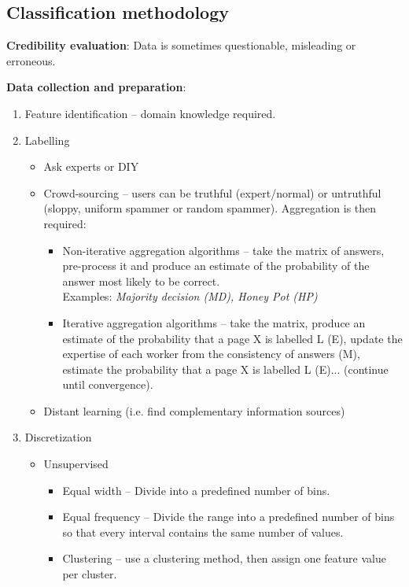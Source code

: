\subsection{Classification methodology} %
\label{sub:classification_methodology}
	\textbf{Credibility evaluation}: Data is sometimes questionable, misleading or erroneous.

	\textbf{Data collection and preparation}:
	\begin{enumerate}
		\item Feature identification -- domain knowledge required.
		\item Labelling
		\begin{itemize}
			\item Ask experts or DIY
			\item Crowd-sourcing -- users can be truthful (expert/normal) or untruthful (sloppy, uniform spammer or random spammer). Aggregation is then required:
			\begin{itemize}
				\item Non-iterative aggregation algorithms -- take the matrix of answers, pre-process it and produce an estimate of the probability of the answer most likely to be correct.\\
				Examples: \emph{Majority decision (MD), Honey Pot (HP)}
				\item Iterative aggregation algorithms -- take the matrix, produce an estimate of the probability that a page X is labelled L (E), update the expertise of each worker from the consistency of answers (M), estimate the probability that a page X is labelled L (E)... (continue until convergence).
			\end{itemize}
			\item Distant learning (i.e. find complementary information sources)
		\end{itemize}
		\item Discretization
		\begin{itemize}
			\item Unsupervised
			\begin{itemize}
				\item Equal width -- Divide into a predefined number of bins.
				\item Equal frequency -- Divide the range into a predefined number of bins so that every interval contains the same number of values.
				\item Clustering -- use a clustering method, then assign one feature value per cluster.
			\end{itemize}

\end{itemize}
\end{enumerate}
